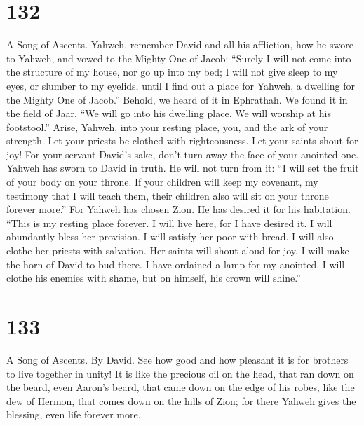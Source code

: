 \hypertarget{section-124}{%
\section{132}\label{section-124}}

A Song of Ascents.  Yahweh, remember David and all his
affliction,  how he swore to Yahweh, and vowed to the
Mighty One of Jacob:  ``Surely I will not come into the
structure of my house, nor go up into my bed;  I will not
give sleep to my eyes, or slumber to my eyelids,  until I
find out a place for Yahweh, a dwelling for the Mighty One of Jacob.''
 Behold, we heard of it in Ephrathah. We found it in the
field of Jaar.  ``We will go into his dwelling place. We
will worship at his footstool.''  Arise, Yahweh, into your
resting place, you, and the ark of your strength.  Let
your priests be clothed with righteousness. Let your saints shout for
joy!  For your servant David's sake, don't turn away the
face of your anointed one.  Yahweh has sworn to David in
truth. He will not turn from it: ``I will set the fruit of your body on
your throne.  If your children will keep my covenant, my
testimony that I will teach them, their children also will sit on your
throne forever more.''  For Yahweh has chosen Zion. He
has desired it for his habitation.  ``This is my resting
place forever. I will live here, for I have desired it. 
I will abundantly bless her provision. I will satisfy her poor with
bread.  I will also clothe her priests with salvation.
Her saints will shout aloud for joy.  I will make the
horn of David to bud there. I have ordained a lamp for my anointed.
 I will clothe his enemies with shame, but on himself,
his crown will shine.''

\hypertarget{section-125}{%
\section{133}\label{section-125}}

A Song of Ascents. By David.  See how good and how
pleasant it is for brothers to live together in unity!  It
is like the precious oil on the head, that ran down on the beard, even
Aaron's beard, that came down on the edge of his robes, 
like the dew of Hermon, that comes down on the hills of Zion; for there
Yahweh gives the blessing, even life forever more.

